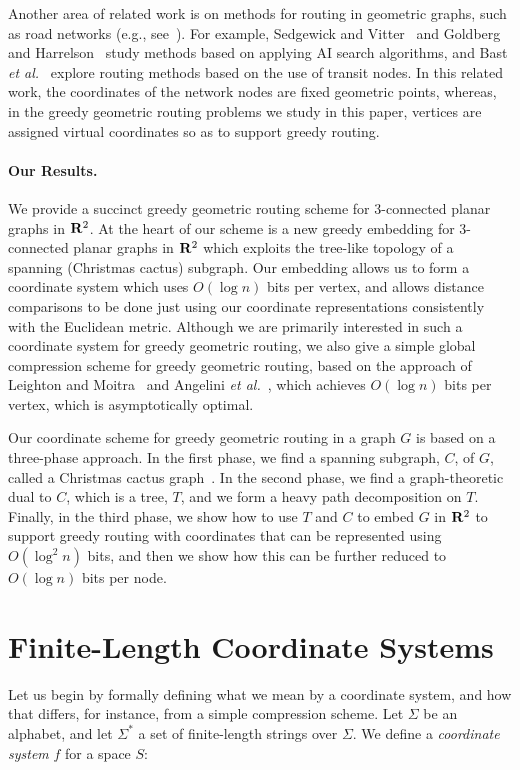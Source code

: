 \documentclass[11pt]{article}
\newcommand{\R}{{\bf R}}
\renewcommand{\subsection}[1]{\paragraph{#1.}}
\begin{document}
Another area of related work is on methods for routing in geometric
graphs, such as road networks
(e.g., see~\cite{bfss-frrn-07,gh-cspasm-05,hsww-csuts-05,kp-sppls-06,ss-hhhes-05,sv-speg-86,zn-spaeu-98}).
For example, 
Sedgewick and Vitter~\cite{sv-speg-86} 
and Goldberg and Harrelson~\cite{gh-cspasm-05}
study methods
based on applying AI search algorithms, and
Bast {\it et al.}~\cite{bfss-frrn-07} explore routing methods based on the
use of transit nodes.
In this related work, the coordinates of the network nodes are fixed 
geometric points, whereas, in the greedy geometric routing problems we
study in this paper, vertices are assigned virtual coordinates so
as to support greedy routing.
\fi

\subsection{Our Results}
We provide a succinct greedy geometric routing scheme for 3-connected
planar graphs in $\R^2$. At the heart of our scheme is a new greedy 
embedding for 3-connected planar graphs in $\R^2$ which exploits the 
tree-like topology of a spanning (Christmas cactus) subgraph. Our
embedding allows us to form a coordinate system which uses $O(\log{n})$ bits 
per vertex, and allows distance comparisons to be done just using our 
coordinate representations consistently with the Euclidean metric.
\ifFull
Although we are primarily interested in such a coordinate system for greedy
geometric routing, we also give a simple global 
compression scheme for greedy geometric routing, based on the
approach of Leighton and Moitra~\cite{lm-srgem-08} 
and Angelini {\it et al.}~\cite{afg-acgdt-08}, which achieves $O(\log n)$
bits per vertex, which is asymptotically optimal.

\fi
\ifFull
Our coordinate scheme for greedy geometric routing in a graph $G$ 
is based on a three-phase approach. In the first phase, we find a 
spanning subgraph, $C$, of $G$, called a Christmas cactus 
graph~\cite{lm-srgem-08}. In the second phase, we find a 
graph-theoretic dual to $C$, which is a tree, $T$, and we form a 
heavy path decomposition on $T$.
Finally, in the third phase, we show how to use $T$ and $C$ to embed
$G$ in $\R^2$ to support greedy routing with coordinates that can be
represented using $O(\log^2{n})$ bits, and then we show how this can
be further reduced to $O(\log n)$ bits per node.
\fi

\section{Finite-Length Coordinate Systems}
Let us begin by formally defining what we mean by a coordinate
system, and how that differs, for instance, from a simple compression scheme.
Let $\Sigma$ be an alphabet, and let $\Sigma^*$ a set of finite-length strings 
over $\Sigma$. 
We define a \emph{coordinate system} $f$ for a space $S$:
\end{document}
